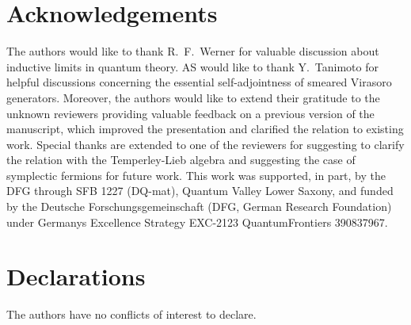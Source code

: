 \documentclass[a4paper, 11pt]{article}
\DeclareMathOperator{\1}{\mathds{1}}
\begin{document}
\section*{Acknowledgements}
The authors would like to thank R.~F.~Werner for valuable discussion about inductive limits in quantum theory. AS would like to thank Y.~Tanimoto for helpful discussions concerning the essential self-adjointness of smeared Virasoro generators. Moreover, the authors would like to extend their gratitude to the unknown reviewers providing valuable feedback on a previous version of the manuscript, which improved the presentation and clarified the relation to existing work. Special thanks are extended to one of the reviewers for suggesting to clarify the relation with the Temperley-Lieb algebra and suggesting the case of symplectic fermions for future work. This work was supported, in part, by the DFG through SFB 1227 (DQ-mat), Quantum Valley Lower Saxony, and funded by the Deutsche Forschungsgemeinschaft (DFG, German Research Foundation) under Germanys Excellence Strategy EXC-2123 QuantumFrontiers 390837967.

\section*{Declarations}

The authors have no conflicts of interest to declare.

\end{document}
